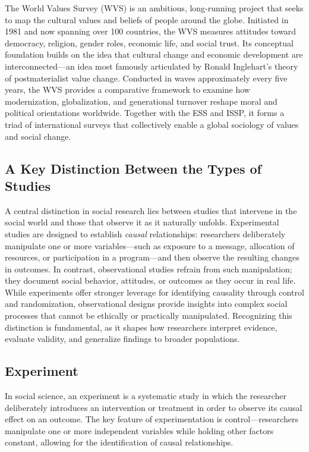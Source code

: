 \documentclass[
  letterpaper,
  DIV=11,
  numbers=noendperiod]{scrreprt}
\begin{document}
The World Values Survey (WVS) is an ambitious, long-running project that
seeks to map the cultural values and beliefs of people around the globe.
Initiated in 1981 and now spanning over 100 countries, the WVS measures
attitudes toward democracy, religion, gender roles, economic life, and
social trust. Its conceptual foundation builds on the idea that cultural
change and economic development are interconnected---an idea most
famously articulated by Ronald Inglehart's theory of postmaterialist
value change. Conducted in waves approximately every five years, the WVS
provides a comparative framework to examine how modernization,
globalization, and generational turnover reshape moral and political
orientations worldwide. Together with the ESS and ISSP, it forms a triad
of international surveys that collectively enable a global sociology of
values and social change.

\subsection{A Key Distinction Between the Types of
Studies}\label{a-key-distinction-between-the-types-of-studies}

A central distinction in social research lies between studies that
intervene in the social world and those that observe it as it naturally
unfolds. Experimental studies are designed to establish \emph{causal}
relationships: researchers deliberately manipulate one or more
variables---such as exposure to a message, allocation of resources, or
participation in a program---and then observe the resulting changes in
outcomes. In contrast, observational studies refrain from such
manipulation; they document social behavior, attitudes, or outcomes as
they occur in real life. While experiments offer stronger leverage for
identifying causality through control and randomization, observational
designs provide insights into complex social processes that cannot be
ethically or practically manipulated. Recognizing this distinction is
fundamental, as it shapes how researchers interpret evidence, evaluate
validity, and generalize findings to broader populations.

\subsection{Experiment}\label{experiment}

In social science, an experiment is a systematic study in which the
researcher deliberately introduces an intervention or treatment in order
to observe its causal effect on an outcome. The key feature of
experimentation is control---researchers manipulate one or more
independent variables while holding other factors constant, allowing for
the identification of causal relationships.
\end{document}
